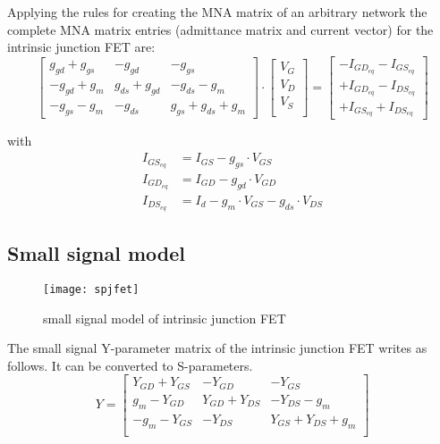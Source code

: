 Applying the rules for creating the MNA matrix of an arbitrary network
the complete MNA matrix entries (admittance matrix and current vector)
for the intrinsic junction FET are:
\begin{equation}
\begin{bmatrix}
g_{gd} + g_{gs} & -g_{gd} & -g_{gs}\\
-g_{gd} + g_{m} & g_{ds} + g_{gd} & -g_{ds} - g_{m}\\
-g_{gs} - g_{m} & -g_{ds} & g_{gs} + g_{ds} + g_{m}
\end{bmatrix}
\cdot
\begin{bmatrix}
V_{G}\\
V_{D}\\
V_{S}\\
\end{bmatrix}
=
\begin{bmatrix}
-I_{GD_{eq}} - I_{GS_{eq}}\\
+I_{GD_{eq}} - I_{DS_{eq}}\\
+I_{GS_{eq}} + I_{DS_{eq}}
\end{bmatrix}
\end{equation}

with
\begin{align}
I_{GS_{eq}} &= I_{GS} - g_{gs}\cdot V_{GS}\\
I_{GD_{eq}} &= I_{GD} - g_{gd}\cdot V_{GD}\\
I_{DS_{eq}} &= I_{d} - g_{m}\cdot V_{GS} - g_{ds}\cdot V_{DS}
\end{align}

\subsection{Small signal model}

\begin{figure}[ht]
\begin{center}
\texttt{[image: spjfet]}
\end{center}
\caption{small signal model of intrinsic junction FET}
\label{fig:spjfet}
\end{figure}
\FloatBarrier

The small signal Y-parameter matrix of the intrinsic junction FET
writes as follows.  It can be converted to S-parameters.
\begin{equation}
Y =
\begin{bmatrix}
Y_{GD} + Y_{GS} & -Y_{GD} & -Y_{GS}\\
g_{m} - Y_{GD} & Y_{GD} + Y_{DS} & -Y_{DS} - g_{m}\\
-g_{m} - Y_{GS} & -Y_{DS} & Y_{GS} + Y_{DS} + g_{m}\\
\end{bmatrix}
\end{equation}

